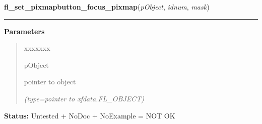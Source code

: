 \hspace{.8\funcindent}\begin{boxedminipage}{\funcwidth}

    \raggedright \textbf{fl\_set\_pixmapbutton\_focus\_pixmap}(\textit{pObject}, \textit{idnum}, \textit{mask})

    \vspace{-1.5ex}

    \rule{\textwidth}{0.5\fboxrule}
\setlength{\parskip}{2ex}
\setlength{\parskip}{1ex}
      \textbf{Parameters}
      \vspace{-1ex}

      \begin{quote}
        \begin{Ventry}{xxxxxxx}

          \item[pObject]

          pointer to object

            {\it (type=pointer to xfdata.FL\_OBJECT)}

        \end{Ventry}

      \end{quote}

\textbf{Status:} Untested + NoDoc + NoExample = NOT OK



    \end{boxedminipage}

    \label{xformslib:library:fl_get_button}

    \vspace{0.5ex}

